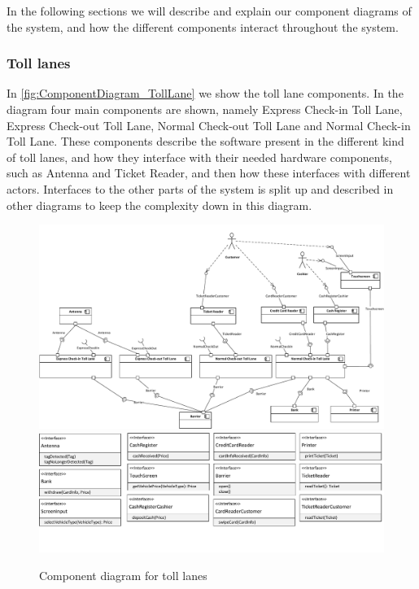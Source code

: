 
In the following sections we will describe and explain our component diagrams of the system, and how the different components interact throughout the system.
\subsubsection*{Toll lanes}
In \autoref{fig:ComponentDiagram_TollLane} we show the toll lane components. In the diagram four main components are shown, namely Express Check-in Toll Lane, Express Check-out Toll Lane, Normal Check-out Toll Lane and Normal Check-in Toll Lane. These components describe the software present in the different kind of toll lanes, and how they interface with their needed hardware components, such as Antenna and Ticket Reader, and then how these interfaces with different actors. Interfaces to the other parts of the system is split up and described in other diagrams to keep the complexity down in this diagram.
\begin{figure}
\centering
\includegraphics[width=1\textwidth]{img/component_diagrams/ComponentDiagram_TollLane_components}
\includegraphics[width=1\textwidth]{img/component_diagrams/ComponentDiagram_TollLane_interfaces}
\caption{Component diagram for toll lanes}
\label{fig:ComponentDiagram_TollLane}
\end{figure}

